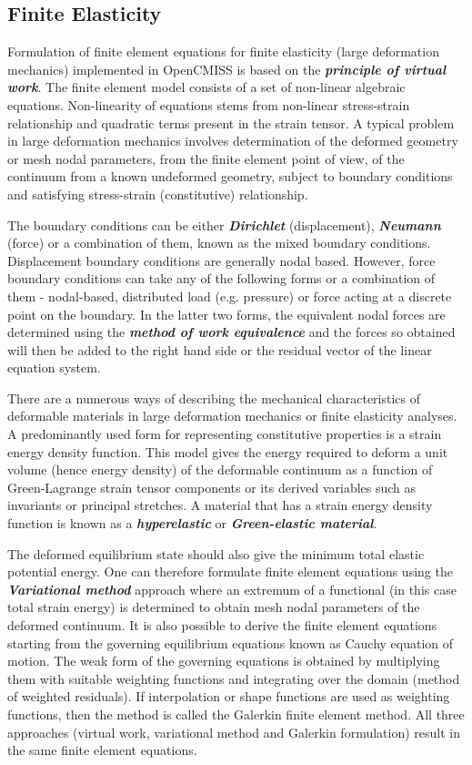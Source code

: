  
\subsection{Finite Elasticity}

Formulation of finite element equations for finite elasticity (large deformation mechanics) implemented in OpenCMISS is based on the 
\textit{\textbf{principle of virtual work}}. The finite element model consists of a set of non-linear algebraic equations. Non-linearity of 
equations stems from non-linear stress-strain relationship and quadratic terms present in the strain tensor. A typical problem in large deformation 
mechanics involves determination of the deformed geometry or mesh nodal parameters, from the finite element point of view, of the continuum 
from a known undeformed geometry, subject to boundary conditions and satisfying stress-strain (constitutive) relationship. 
  
The boundary conditions can be either \textit{\textbf{Dirichlet}} (displacement), \textit{\textbf{Neumann}} (force) or a combination of them, known 
as the mixed boundary conditions. Displacement boundary conditions are generally nodal based. However, force boundary conditions can take 
any of the following forms or a combination of them - nodal-based, distributed load (e.g. pressure) or force acting at a discrete point 
on the boundary. In the latter two forms, the equivalent nodal forces are determined using the \textit{\textbf{method of work equivalence}} 
\cite{hutton:2004} and the forces so obtained will then be added to the right hand side or the residual vector of the linear equation system.  

There are a numerous ways of describing the mechanical characteristics of deformable materials in large deformation mechanics or finite elasticity
analyses. A predominantly used form for representing constitutive properties is a strain energy density function. This model gives the energy 
required to deform a unit volume (hence energy density) of the deformable continuum as a function of Green-Lagrange strain tensor components or its 
derived variables such as invariants or principal stretches. A material that has a strain energy density function is known as a 
\textit{\textbf{hyperelastic}} or \textit{\textbf{Green-elastic material}}. 

The deformed equilibrium state should also give the minimum total elastic potential energy. One can therefore formulate finite element equations 
using the \textit{\textbf{Variational method}} approach where an extremum of a functional (in this case total strain energy) is determined to 
obtain mesh nodal parameters of the deformed continuum. It is also possible to derive the finite element equations starting from the governing
equilibrium equations known as Cauchy equation of motion. The weak form of the governing equations is obtained by multiplying them with suitable
weighting functions and integrating over the domain (method of weighted residuals). If interpolation or shape functions are used as weighting 
functions, then the method is called the Galerkin finite element method. All three approaches (virtual work, variational method and 
Galerkin formulation) result in the same finite element equations.     

